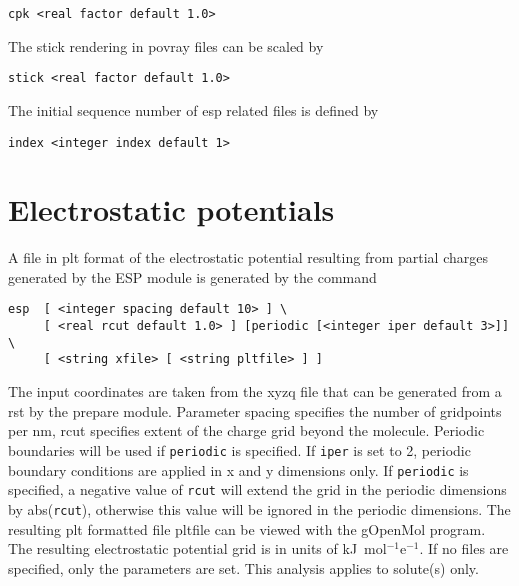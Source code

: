 \begin{verbatim}
cpk <real factor default 1.0>
\end{verbatim}
\par

The stick rendering in povray files can be scaled by

\begin{verbatim}
stick <real factor default 1.0>
\end{verbatim}

The initial sequence number of esp related files is defined by

\begin{verbatim}
index <integer index default 1>
\end{verbatim}

\section{Electrostatic potentials}

A file in plt format of the electrostatic potential resulting
from partial charges generated by the ESP module is generated
by the command

\begin{verbatim}
esp  [ <integer spacing default 10> ] \
     [ <real rcut default 1.0> ] [periodic [<integer iper default 3>]] \
     [ <string xfile> [ <string pltfile> ] ]
\end{verbatim}

The input coordinates are taken from the {\rm xyzq} file that can
be generated from a {\rm rst} by the prepare module. Parameter 
spacing specifies the number of gridpoints per nm, rcut specifies 
extent of the charge grid beyond the molecule.
Periodic boundaries will be used if \verb+periodic+
is specified. If \verb+iper+ is set to 2, periodic boundary
conditions are applied in x and y dimensions only. If \verb+periodic+
is specified, a negative value of \verb+rcut+ will extend the grid
in the periodic dimensions by abs(\verb+rcut+), otherwise this value
will be ignored in the periodic dimensions.
The resulting {\rm plt} formatted file pltfile can be
viewed with the gOpenMol program. The resulting electrostatic 
potential grid is in units of kJ\ mol$^{-1}$e$^{-1}$.
If no files are specified, only the parameters are set. This
analysis applies to solute(s) only.

